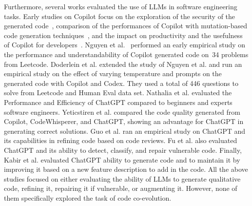 Furthermore, several works evaluated the use of LLMs in software engineering tasks. 
%
Early studies on Copilot focus on the exploration of the security of the generated code~\cite{pearce2022asleep}, comparison of the performances of Copilot with mutation-based code generation techniques~\cite{sobania2022choose}, and  the impact on productivity and the usefulness of Copilot for developers~\cite{ziegler2022productivity,vaithilingam2022expectation}. 
%
Nguyen et al.~\cite{nguyen2022empirical} performed an early empirical study on the performance and understandability of Copilot generated code on~34 problems from Leetcode. 
%
Doderlein et al. \cite{doderlein2022piloting} extended the study of Nguyen et al. \cite{nguyen2022empirical} and run an empirical study on the effect of varying temperature and prompts on the generated code with Copilot and Codex. They used a total of 446 questions to solve from Leetcode and Human Eval data set. 
%
Nathalia et al. \cite{nathalia2023artificial} evaluated the Performance and Efficiency of ChatGPT compared to beginners and experts software engineers. 
%
Yeticstiren et al. \cite{yeticstiren2023evaluating} compared the code quality generated from Copilot, CodeWhisperer, and ChatGPT, showing an advantage for ChatGPT in generating correct solutions. 
%
Guo et al. \cite{guo2023exploring} ran an empirical study on ChatGPT and its capabilities in refining code based on code reviews. 
%
Fu et al. \cite{fu2023chatgpt} also evaluated ChatGPT and its ability to detect, classify, and repair vulnerable code. 
%
Finally, Kabir et al. \cite{kabir2023empirical} evaluated ChatGPT ability to generate code and to maintain it by improving it based on a new feature description to add in the code. 
%
All the above studies focused on either evaluating the ability of LLMs to generate qualitative code, refining it, repairing it if vulnerable, or augmenting it. However, none of them specifically explored the task of code co-evolution.

